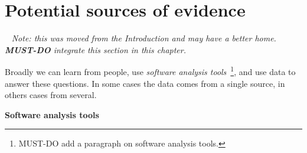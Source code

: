 \section{Potential sources of evidence}~\label{sec:potential-sources-of-evidence}
\emph{Note: this was moved from the Introduction and may have a better home. \textbf{MUST-DO} integrate this section in this chapter.}




Broadly we can learn from people, use \textit{software analysis tools}~\footnote{MUST-DO add a paragraph on software analysis tools.}, and use data to answer these questions. In some cases the data comes from a single source, in others cases from several.

\textbf{Software analysis tools} 

